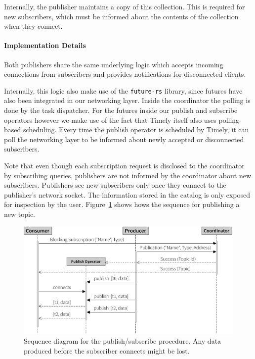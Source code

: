 Internally, the publisher maintains a copy of this collection. This is required
for new subscribers, which must be informed about the contents of the collection
when they connect.

\paragraph{Implementation Details}

Both publishers share the same underlying logic which accepts incoming connections
from subscribers and provides notifications for disconnected clients.

Internally, this logic also make use of the \lstinline{future-rs} library, 
since futures have also been integrated in our networking layer.
Inside the coordinator the polling is done by the task dispatcher. For the futures
inside our publish and subscribe operators however we make use of the fact
that Timely itself also uses polling-based scheduling. Every time the publish operator
is scheduled by Timely, it can poll the networking layer to be informed
about newly accepted or disconnected subscribers.

Note that even though each subscription request is disclosed to the coordinator
by subscribing queries, publishers are not informed by the coordinator about new subscribers. Publishers
see new subscribers only once they connect to the publisher's network socket. 
The information stored in the catalog is only exposed for inspection by the user.
Figure~\ref{fig:pubsubseq} shows hows the sequence for publishing a new topic.

\begin{figure}[htb]
  \centering
    \vspace{1em}
    \includegraphics[width=1\textwidth]{figures/pubsubseq}
  \caption[Publish/subscribe sequence diagram]{Sequence diagram for the publish/subscribe procedure. Any data
  produced before the subscriber connects might be lost.}
  \label{fig:pubsubseq}
\end{figure}

